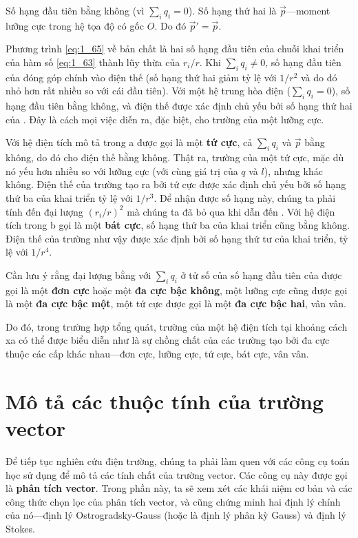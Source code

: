 \noindent
Số hạng đầu tiên bằng không (vì $\sum_iq_i=0$). Số hạng thứ hai là $\vec{p}$---moment lưỡng cực trong hệ tọa độ có gốc $O$. Do đó $\vec{p}'=\vec{p}$.

Phương trình \eqref{eq:1_65} về bản chất là hai số hạng đầu tiên của chuỗi khai triển của hàm số \eqref{eq:1_63} thành lũy thừa của $r_i/r$. Khi $\sum_iq_i\neq 0$, số hạng đầu tiên của  đóng góp chính vào điện thế (số hạng thứ hai giảm tỷ lệ với $1/r^2$ và do đó nhỏ hơn rất nhiều so với cái đầu tiên). Với một hệ trung hòa điện ($\sum_iq_i=0$), số hạng đầu tiên bằng không, và điện thế được xác định chủ yếu bởi số hạng thứ hai của . Đây là cách mọi việc diễn ra, đặc biệt, cho trường của một lưỡng cực.

Với hệ điện tích mô tả trong a được gọi là một \textbf{tứ cực}, cả $\sum_iq_i$ và $\vec{p}$ bằng không, do đó  cho điện thế bằng không. Thật ra, trường của một tứ cực, mặc dù nó yếu hơn nhiều so với lưỡng cực (với cùng giá trị của $q$ và $l$), nhưng khác không. Điện thế của trường tạo ra bởi tứ cực được xác định chủ yếu bởi số hạng thứ ba của khai triển tỷ lệ với $1/r^3$. Để nhận được số hạng này, chúng ta phải tính đến đại lượng $(r_i/r)^2$ mà chúng ta đã bỏ qua khi dẫn đến . Với hệ điện tích trong b gọi là một \textbf{bát cực}, số hạng thứ ba của khai triển cũng bằng không. Điện thế của trường như vậy được xác định bởi số hạng thứ tư của khai triển, tỷ lệ với $1/r^4$.

Cần lưu ý rằng đại lượng bằng với $\sum_iq_i$ ở tử số của số hạng đầu tiên của  được gọi là một \textbf{đơn cực} hoặc một \textbf{đa cực bậc không}, một lưỡng cực cũng được gọi là một \textbf{đa cực bậc một}, một tứ cực được gọi là một \textbf{đa cực bậc hai}, vân vân.

Do đó, trong trường hợp tổng quát, trường của một hệ điện tích tại khoảng cách xa có thể được biểu diễn như là sự chồng chất của các trường tạo bởi đa cực thuộc các cấp khác nhau---đơn cực, lưỡng cực, tứ cực, bát cực, vân vân.

\section{Mô tả các thuộc tính của trường vector}\label{sec:1_11}

Để tiếp tục nghiên cứu điện trường, chúng ta phải làm quen với các công cụ toán học sử dụng để mô tả các tính chất của trường vector. Các công cụ này được gọi là \textbf{phân tích vector}. Trong phần này, ta sẽ xem xét các khái niệm cơ bản và các công thức chọn lọc của phân tích vector, và cũng chứng minh hai định lý chính của nó---định lý Ostrogradsky-Gauss (hoặc là định lý phân kỳ Gauss) và định lý Stokes.

